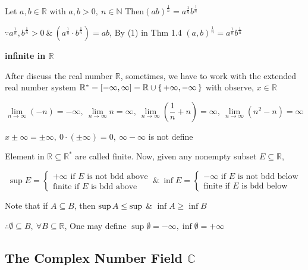 \begin{cor*}
	Let $a,b \in \mathbb{R}$ with $a,b > 0,~ n \in \mathbb{N}$ Then$(ab)^{\frac{1}{n}} = a^{\frac{1}{n}} b^{\frac{1}{n}}$
	
	$\because a^{\frac{1}{n}},b^{\frac{1}{n}} > 0 ~\& ~ (a^{\frac{1}{n}} \cdot b^{\frac{1}{n}}) = ab$, By (1) in Thm 1.4 $(a,b)^{\frac{1}{n}} = a^{\frac{1}{n}}b^{\frac{1}{n}}$
\end{cor*}

\textbf{infinite in $\mathbb R$}



After discuss the real number $\mathbb{R}$, sometimes, we have to work with the extended real number system $\mathbb{R}^* = [-\infty,\infty] = \mathbb{R} \cup \sett{+\infty,-\infty}$ with observe, $x \in \mathbb{R}$

\begin{tcolorbox}
	$$\lim_{n\rightarrow \infty}(-n) = -\infty,~\lim_{n \rightarrow \infty}n=\infty,~\lim_{n \rightarrow \infty}(\frac{1}{n}+n) = \infty,~\lim_{n \rightarrow \infty}(n^2-n) = \infty$$
	
	\begin{center}
		$x \pm \infty = \pm \infty,~ 0\cdot(\pm \infty) = 0,~\infty - \infty$ is not define
	\end{center}
\end{tcolorbox}


Element in $\mathbb R \subseteq \mathbb R^{*}$ are called finite. Now, given any nonempty subset $E \subseteq \mathbb R,$

$$\sup E = \begin{cases}
	+\infty \text{ if } E \text{ is not bdd above}\\\text{finite if $E$ is bdd above}
\end{cases} ~\&~ \inf E =\begin{cases}
	-\infty \text{ if $E$ is not bdd below} \\ \text{finite if $E$ is bdd below}
\end{cases}$$



Note that if $A \subseteq B$, then $\sup A \leq \sub B$ \& $\inf A \geq \inf B$

$\therefore \emptyset \subseteq B,~ \forall B \subseteq \mathbb R$, One may define $\sup \emptyset = - \infty, \inf \emptyset = + \infty$

\newpage
\subsection{The Complex Number Field $\mathbb C$} $ $

